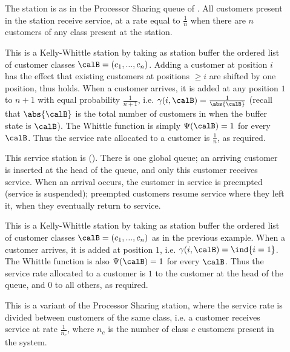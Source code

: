 \begin{description}
    \item[] The station
        is as in the Processor Sharing queue of
        . All customers present in the
        station receive service, at a rate equal to
        $\frac{1}{n}$ when there are $n$ customers of any
        class present at the station.

This is a Kelly-Whittle station by taking as
    station buffer the ordered list of
    customer classes $\calB=(c_1, ..., c_n)$. Adding
    a customer at position $i$ has the effect that existing
    customers at positions $\geq i$ are shifted by one
position, thus  holds. When a
customer arrives, it is added at any position
$1$ to $n+1$  with equal probability
$\frac{1}{n+1}$, i.e. $
    \gamma(i,\calB)=\frac{1}{\abs{\calB}} $ (recall that
    $\abs{\calB}$ is the total number of customers in when
    the buffer state is $\calB$).
The Whittle function is simply $\Psi(\calB)=1$
for every $\calB$. Thus the
    service rate allocated to a customer is
    $\frac{1}{n}$, as required.


\item[] This service station is  ().
    There is one global queue; an arriving customer is
    inserted at the head of the queue, and only this
    customer receives service. When an arrival occurs, the
    customer in service is preempted (service is
    suspended); preempted customers resume service where
    they left it, when they eventually return to service.


This is a Kelly-Whittle station by taking as
station buffer the ordered list of customer
classes $\calB=(c_1, ..., c_n)$ as in the
previous example. When a
    customer arrives, it is added at position $1$, i.e.
    $
    \gamma(i,\calB)=\ind{i=1}
    $.
The Whittle function is also $\Psi(\calB)=1$ for
every $\calB$. Thus the service rate allocated to
a customer is $1$ to the customer at the head of
the queue, and $0$ to all others, as required.


\item[] This is a variant
    of the Processor Sharing station, where the service rate is divided
    between customers of the same class, i.e. a customer receives service
    at rate $\frac{1}{n_c}$, where $n_c$ is the number of class $c$ customers
    present in the system.


\end{description}
